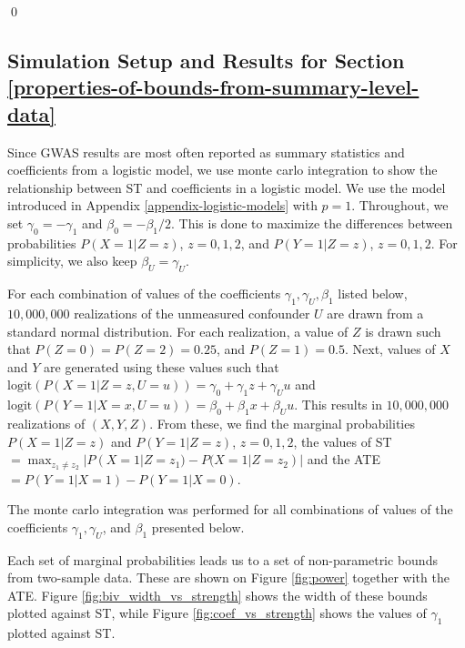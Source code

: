 \documentclass[
]{article}
\theoremstyle{plain}
\begin{document}
\qed

\newpage

\hypertarget{simulation-setup-and-results-for-section}{%
\subsection{\texorpdfstring{Simulation Setup and Results for Section \ref{properties-of-bounds-from-summary-level-data} \label{appendix-sim-results}}{Simulation Setup and Results for Section  }}\label{simulation-setup-and-results-for-section}}

Since GWAS results are most often reported as summary statistics and coefficients from a logistic model, we use monte carlo integration to show the relationship between ST and coefficients in a logistic model. We use the model introduced in Appendix \ref{appendix-logistic-models} with \(p=1\). Throughout, we set \(\gamma_0 = -\gamma_1\) and \(\beta_0 = -\beta_1/2\). This is done to maximize the differences between probabilities \(P(X = 1 | Z = z)\), \(z=0,1,2\), and \(P(Y = 1 | Z = z)\), \(z=0,1,2\). For simplicity, we also keep \(\beta_U = \gamma_U\).

For each combination of values of the coefficients \(\gamma_1, \gamma_U, \beta_1\) listed below, \(10,000,000\) realizations of the unmeasured confounder \(U\) are drawn from a standard normal distribution. For each realization, a value of \(Z\) is drawn such that \(P(Z = 0) = P(Z = 2) = 0.25\), and \(P(Z = 1) = 0.5\). Next, values of \(X\) and \(Y\) are generated using these values such that \(\text{logit}(P(X = 1 | Z = z, U = u)) = \gamma_0 + \gamma_1 z + \gamma_U u\) and \(\text{logit}(P(Y = 1 | X = x, U = u)) = \beta_0 + \beta_1 x + \beta_U u\). This results in \(10,000,000\) realizations of \((X,Y,Z)\). From these, we find the marginal probabilities \(P(X = 1 | Z = z)\) and \(P(Y = 1 | Z = z)\), \(z = 0,1,2\), the values of ST \(=\max_{z_1 \neq z_2} |P(X = 1 | Z = z_1) - P(X = 1 | Z = z_2)|\) and the ATE \(= P(Y = 1 | X = 1) - P(Y = 1 | X = 0)\).

\begin{table}[H]
  \centering
  \caption{The monte carlo integration was performed for all combinations of values of the coefficients $\gamma_1, \gamma_U$, and $\beta_1$ presented below.}
  \label{tab:sim_coefficients}
  
\end{table}

Each set of marginal probabilities leads us to a set of non-parametric bounds from two-sample data. These are shown on Figure \ref{fig:power} together with the ATE. Figure \ref{fig:biv_width_vs_strength} shows the width of these bounds plotted against ST, while Figure \ref{fig:coef_vs_strength} shows the values of \(\gamma_1\) plotted against ST.
\end{document}
